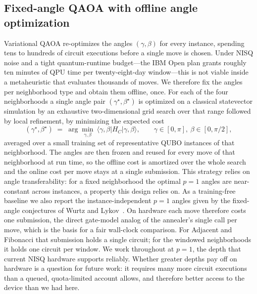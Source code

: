 \documentclass{svproc}
\begin{document}
\subsection{Fixed-angle QAOA with offline angle optimization}
\label{subsec:fixed}
Variational QAOA re-optimizes the angles $(\gamma,\beta)$ for every
instance, spending tens to hundreds of circuit executions before a single
move is chosen. Under NISQ noise and a tight quantum-runtime budget---the
IBM Open plan grants roughly ten minutes of QPU time per twenty-eight-day
window---this is not viable inside a metaheuristic that evaluates
thousands of moves. We therefore fix the angles per neighborhood type and
obtain them offline, once. For each of the four neighborhoods a single
angle pair $(\gamma^\star,\beta^\star)$ is optimized on a classical
statevector simulation by an exhaustive two-dimensional grid search over that
range followed by local refinement, by minimizing the expected cost
\begin{equation}
  (\gamma^\star,\beta^\star)
  \;=\; \arg\min_{\gamma,\beta}\
  \langle\gamma,\beta\lvert H_C\rvert\gamma,\beta\rangle,
  \qquad \gamma\in[0,\pi],\ \beta\in[0,\pi/2],
  \label{eq:angleopt}
\end{equation}
averaged over a small training set of representative QUBO instances of
that neighborhood. The angles are then frozen and reused for every move
of that neighborhood at run time, so the offline cost is amortized over
the whole search and the online cost per move stays at a single
submission. This strategy relies on angle transferability: for a fixed
neighborhood the optimal $p=1$ angles are near-constant across instances,
a property this design relies on. As a
training-free baseline we also report the instance-independent $p=1$
angles given by the fixed-angle conjectures of Wurtz and
Lykov~\cite{wurtz2021fixed}. On hardware each move therefore costs one
submission, the direct gate-model analog of the annealer's single
call per move, which is the basis for a fair wall-clock comparison. For
Adjacent and Fibonacci that submission holds a single circuit; for the
windowed neighborhoods it holds one circuit per window. We
work throughout at $p=1$, the depth that current NISQ hardware supports
reliably. Whether greater depths pay off on hardware is a question for future
work: it requires many more circuit executions than a queued, quota-limited
account allows, and therefore better access to the device than we had here.
\end{document}
